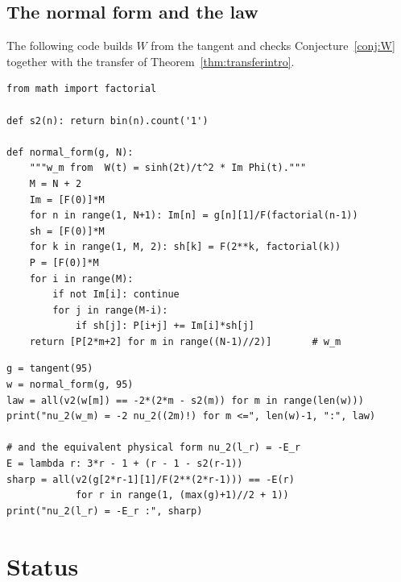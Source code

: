 \documentclass[12pt]{amsart}
\theoremstyle{definition}
\theoremstyle{remark}
\begin{document}
\subsection{The normal form and the law}

The following code builds $W$ from the tangent and checks Conjecture~\ref{conj:W} together with the transfer of Theorem~\ref{thm:transferintro}.

{\small
\begin{verbatim}
from math import factorial

def s2(n): return bin(n).count('1')

def normal_form(g, N):
    """w_m from  W(t) = sinh(2t)/t^2 * Im Phi(t)."""
    M = N + 2
    Im = [F(0)]*M
    for n in range(1, N+1): Im[n] = g[n][1]/F(factorial(n-1))
    sh = [F(0)]*M
    for k in range(1, M, 2): sh[k] = F(2**k, factorial(k))
    P = [F(0)]*M
    for i in range(M):
        if not Im[i]: continue
        for j in range(M-i):
            if sh[j]: P[i+j] += Im[i]*sh[j]
    return [P[2*m+2] for m in range((N-1)//2)]       # w_m
\end{verbatim}
}

{\small
\begin{verbatim}
g = tangent(95)
w = normal_form(g, 95)
law = all(v2(w[m]) == -2*(2*m - s2(m)) for m in range(len(w)))
print("nu_2(w_m) = -2 nu_2((2m)!) for m <=", len(w)-1, ":", law)

# and the equivalent physical form nu_2(l_r) = -E_r
E = lambda r: 3*r - 1 + (r - 1 - s2(r-1))
sharp = all(v2(g[2*r-1][1]/F(2**(2*r-1))) == -E(r)
            for r in range(1, (max(g)+1)//2 + 1))
print("nu_2(l_r) = -E_r :", sharp)
\end{verbatim}
}

\section{Status}
\end{document}
